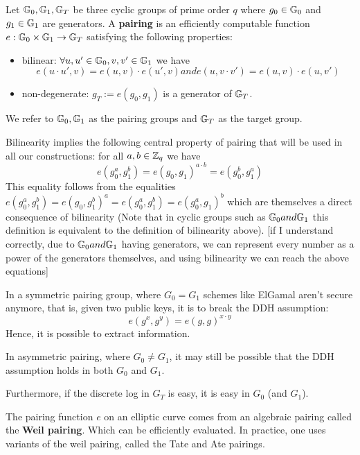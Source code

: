  \begin{definition}
  Let $\mathbb{G}_0, \mathbb{G}_1, \mathbb{G}_T$ be three cyclic groups of prime order $q$ where 
  $g_0\in\mathbb{G}_0$ and $g_1\in\mathbb{G}_1$ are generators. A \textbf{pairing} is an efficiently
  computable function $e: \mathbb{G}_0 \times \mathbb{G}_1 \to \mathbb{G}_T$ satisfying the 
  following properties:
  \begin{itemize}
    \item bilinear: $\forall u,u'\in\mathbb{G}_0, v,v'\in\mathbb{G}_1$  we have 
        $$ e(u\cdot u',v) = e(u,v) \cdot e(u',v) and  e(u,v\cdot v') = e(u,v)\cdot e(u,v')$$
    \item non-degenerate: $g_T := e(g_0,g_1)$  is a generator of $\mathbb{G}_T$.
  \end{itemize}
\end{definition}
We refer to $\mathbb{G}_0,\mathbb{G}_1$ as the pairing groups and $\mathbb{G}_T$ as the target group.

Bilinearity implies the following central property of pairing that will be used
in all our constructions: for all $a, b\in \mathbb{Z}_q$ we have
  $$ e(g_0^a,g_1^b)=e(g_0,g_1)^{a\cdot b}= e(g_0^b,g_1^a)$$
This equality follows from the equalities 
$e(g_0^a,g_1^b)=e(g_0,g_1^b)^a=e(g_0^a,g_1^b)=e(g_0^a,g_1)^b$
which are themselves a direct consequence of bilinearity (Note that in cyclic groups
 such as $\mathbb{G}_0 and \mathbb{G}_1$ this definition is equivalent to the definition of bilinearity above).
[if I understand correctly, due to $\mathbb{G}_0 and \mathbb{G}_1$ having generators, we can represent every number
as a power of the generators themselves, and using bilinearity we can reach the above equations]

In a symmetric pairing group, where $G_0 = G_1$ schemes like ElGamal aren't secure anymore,
that is, given two public keys, it is to break the DDH assumption: 
  $$ e(g^x,g^y) = e(g,g)^{x\cdot y}$$ 
Hence, it is possible to extract information. 

In asymmetric pairing, where $G_0 \neq G_1$, it may still be possible
that the DDH assumption holds in both $G_0$ and $G_1$. 

Furthermore, if the discrete log in $G_T$ is easy, it is easy in $G_0$ (and $G_1$).

\begin{remark}
  The pairing function $e$ on an elliptic curve comes from an algebraic pairing called the \textbf{Weil pairing}.
  Which can be efficiently evaluated. In practice, one uses variants of the weil 
  pairing, called the Tate and Ate pairings.
\end{remark}

